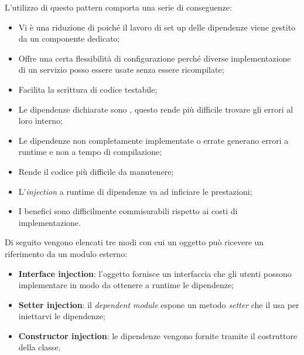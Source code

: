 L'utilizzo di questo pattern comporta una serie di conseguenze:

\begin{itemize}

	\item Vi è una riduzione di  poiché il lavoro di set up delle dipendenze viene gestito da un componente dedicato;
	\item Offre una certa flessibilità di configurazione perché diverse implementazione di un servizio posso essere usate senza essere ricompilate;
	\item Facilita la scrittura di codice testabile;
	\item Le dipendenze dichiarate sono , questo rende più difficile trovare gli errori al loro interno;
	\item Le dipendenze non completamente implementate o errate generano errori a runtime e non a tempo di compilazione;
	\item Rende il codice più difficile da manutenere;
	\item L'\textit{injection} a runtime di dipendenze va ad inficiare le prestazioni;
	\item I benefici sono difficilmente commisurabili rispetto ai costi di implementazione.

\end{itemize}
		
Di seguito vengono elencati tre modi con cui un oggetto può ricevere un riferimento da un modulo esterno:

\begin{itemize}

	\item \textbf{Interface injection}: l'oggetto fornisce un interfaccia che gli utenti possono implementare in modo da ottenere a runtime le dipendenze;
	\item \textbf{Setter injection}: il \textit{dependent module} espone un metodo \textit{setter} che il  usa per iniettarvi le dipendenze;
	\item \textbf{Constructor injection}: le dipendenze vengono fornite tramite il costruttore della classe.

\end{itemize}

